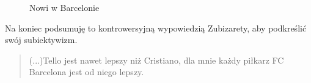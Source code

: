 \documentclass[11pt, a4paper]{article}
\begin{document}
\begin{figure}
\centering
{}
\quad
{}
\quad
{}
\caption{Nowi w Barcelonie}
\label{fig:animals}
\end{figure}

Na koniec podsumuję to kontrowersyjną wypowiedzią Zubizarety, aby podkreślić swój subiektywizm.
\begin{quote}
(...)Tello jest nawet lepszy niż Cristiano, dla mnie każdy piłkarz FC Barcelona jest od niego lepszy.
\end{quote}
\newpage
\end{document}
